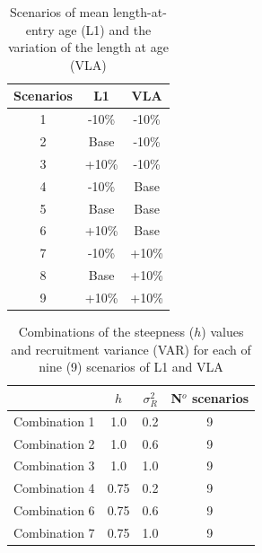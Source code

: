 \documentclass[11pt,letter,]{article}
\begin{document}
\begin{table}[ht]
\centering
\caption{Scenarios of mean length-at-entry age (L1) and the variation of the length at age (VLA) \vspace{0.5cm}}
\label{table1}
\begin{tabular}{c|c|c} \hline
\rowcolor[HTML]{EFEFEF} 
\textbf{Scenarios} & \textbf{L1} & \textbf{VLA} \\ \hline
1                  & -10\%       & -10\%        \\
2                  & Base        & -10\%        \\
3                  & +10\%       & -10\%        \\
4                  & -10\%       & Base         \\
5                  & Base        & Base         \\
6                  & +10\%       & Base         \\
7                  & -10\%       & +10\%        \\
8                  & Base        & +10\%        \\
9                  & +10\%       & +10\%       \\ \hline
\end{tabular}
\end{table}


\begin{table}[h]
\centering
\caption{Combinations of the steepness ($h$) values and recruitment variance (VAR) for each of nine (9) scenarios of L1 and VLA \vspace{0.5cm}}
\label{table2}
\begin{tabular}{c|c|c|c} \hline
\rowcolor[HTML]{EFEFEF} 
              & \textbf{$h$}    & \textbf{$\sigma^2_R$} & \textbf{N$^o$ scenarios} \\ \hline
Combination 1 & 1.0  & 0.2    & 9           \\
Combination 2 & 1.0  & 0.6    & 9           \\
Combination 3 & 1.0  & 1.0    & 9           \\
Combination 4 & 0.75 & 0.2    & 9           \\
Combination 6 & 0.75 & 0.6    & 9           \\
Combination 7 & 0.75 & 1.0    & 9          \\ \hline
\end{tabular}
\end{table}
\end{document}

